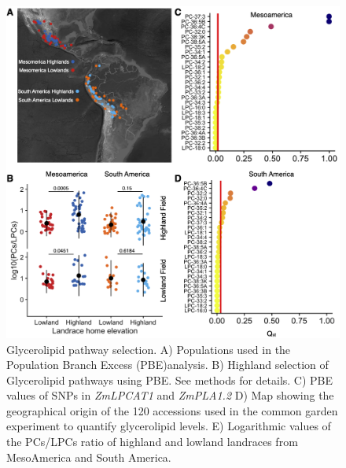 \documentclass[9pt,twocolumn,twoside,lineno]{BioRxiv}
\begin{document}
\begin{figure}[!ht]
\begin{center}
\includegraphics[width=0.7\paperwidth]{Figures/Fig_1.png}
\caption{Glycerolipid pathway selection. 
A) Populations used in the Population Branch Excess (PBE)analysis. 
B) Highland selection of Glycerolipid pathways using PBE. See methods for details.
C) PBE values of SNPs in \textit{ZmLPCAT1} and \textit{ZmPLA1.2}
D) Map showing the geographical origin of the 120 accessions used in the common garden experiment to quantify glycerolipid levels.
E) Logarithmic values of the PCs/LPCs ratio of highland and lowland landraces from MesoAmerica and South America.
} 
\label{Fig1}
\end{center}
\end{figure}
\end{document}
